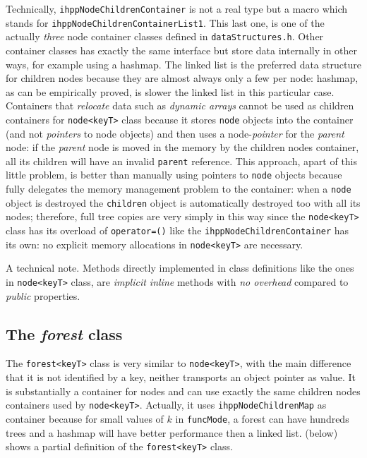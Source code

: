 \documentclass[a4paper,10pt]{report}
\begin{document}
\noindent
Technically, \verb|ihppNodeChildrenContainer| is not a real type but a macro which
stands for \verb|ihppNodeChildrenContainerList1|.
This last one, is one of the actually \emph{three} node container
classes defined in \verb|dataStructures.h|. Other container classes
has exactly the same interface but store data internally in other ways,
for example using a hashmap. The linked list is the preferred data structure
for children nodes because they are almost always only a few per node:
hashmap, as can be empirically proved, is slower the linked list
in this particular case. Containers that \emph{relocate} data
such as \emph{dynamic arrays} cannot be used as children containers for \verb|node<keyT>|
class because it stores \verb|node| objects into the container (and not \emph{pointers} to node objects) and then uses a node-\emph{pointer} for the \emph{parent} node:
if the \emph{parent} node is moved in the memory by the children nodes container,
all its children will have an invalid \verb|parent| reference.
This approach, apart of this little problem, is better than manually using pointers
to \verb|node| objects because fully delegates the memory management problem to the container: when a \verb|node| object is destroyed the \verb|children| object
is automatically destroyed too with all its nodes; therefore, full tree copies
are very simply in this way since the \verb|node<keyT>| class has its
overload of \verb|operator=()| like the \verb|ihppNodeChildrenContainer| has its own:
no explicit memory allocations in \verb|node<keyT>| are necessary.

A technical note. Methods directly implemented in class definitions like
the ones in \verb|node<keyT>| class, are \emph{implicit inline} methods with
\emph{no overhead} compared to \emph{public} properties.

\subsection{The \emph{forest} class}

The \verb|forest<keyT>| class is very similar to \verb|node<keyT>|, with
the main difference that it is not identified by a key, neither transports
an object pointer as value. It is substantially a container
for nodes and can use exactly the same children nodes containers used by \verb|node<keyT>|. Actually, it uses \verb|ihppNodeChildrenMap| as container because for small values
of $k$ in \verb|funcMode|, a forest can have hundreds trees and a hashmap will have
better performance then a linked list.
 (below) shows a partial definition of the \verb|forest<keyT>| class.
\vspace{0.5cm}
\end{document}
